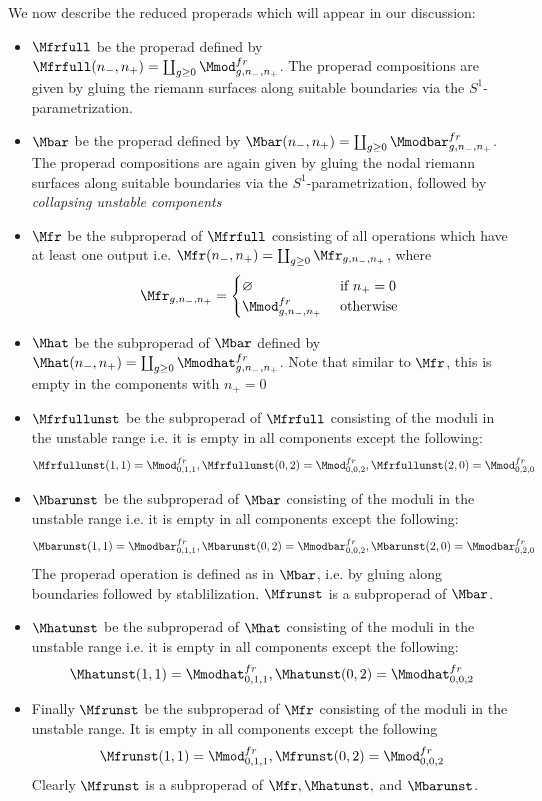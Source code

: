 \documentclass[a4paper,10pt]{amsart}
\begin{document}
We now describe the reduced properads which will appear in our discussion:
	\begin{itemize}
	\item $\Mfrfull$ be the properad defined by $\Mfrfull (n_-,n_+) = \coprod_{g \geq 0} \Mmod^{fr}_{g,n_-,n_+}$. The properad compositions are given by gluing the riemann surfaces along suitable boundaries via the $S^1$-parametrization.
	\item $\Mbar$ be the properad defined by $\Mbar (n_-,n_+) = \coprod_{g \geq 0} \Mmodbar^{fr}_{g,n_-,n_+}$. The properad compositions are again given by gluing the nodal riemann surfaces along suitable boundaries via the $S^1$-parametrization, followed by \emph{collapsing unstable components}
	\item $\Mfr$ be   the subproperad of $\Mfrfull$ consisting of all operations which have at least one output i.e. $\Mfr (n_-,n_+) = \coprod_{g \geq 0} \Mfr_{g,n_-,n_+}$, where
\[\Mfr_{g,n_-,n_+} = \begin{cases} \varnothing &\mbox{ if } n_+=0 \\ \Mmod^{fr}_{g,n_-,n_+} &\mbox{ otherwise }\end{cases} \]
	\item $\Mhat$ be the subproperad of $\Mbar$ defined by $\Mhat (n_-,n_+) = \coprod_{g \geq 0}\Mmodhat^{fr}_{g,n_-,n_+}$. Note that similar to $\Mfr$, this is empty in the components with $n_+=0$
	\item $\Mfrfullunst$ be the subproperad of  $\Mfrfull$ consisting of the moduli in the unstable range i.e. it is empty in all components except the following:
\[
				\Mfrfullunst(1,1) = \Mmod^{fr}_{0,1,1}, \Mfrfullunst(0,2) = \Mmod^{fr}_{0,0,2}, \Mfrfullunst(2,0) = \Mmod^{fr}_{0,2,0} %
\]
	\item $\Mbarunst$ be the subproperad of  $\Mbar$ consisting of the moduli in the unstable range i.e. it is empty in all components except the following:
\[
				\Mbarunst(1,1)=\Mmodbar^{fr}_{0,1,1}, \Mbarunst(0,2) = \Mmodbar^{fr}_{0,0,2}, \Mbarunst(2,0) = \Mmodbar^{fr}_{0,2,0} %
\]
	The properad operation is defined as in $\Mbar$, i.e. by gluing along boundaries followed by stablilization. $\Mfrunst$ is a subproperad of $\Mbar$.
	\item $\Mhatunst$ be the subproperad of $\Mhat$ consisting of the moduli in the unstable range i.e. it is empty in all components except the following:
\[
				\Mhatunst(1,1)=\Mmodhat^{fr}_{0,1,1} , 	  \Mhatunst(0,2)=\Mmodhat^{fr}_{0,0,2} 
\]
	\item Finally $\Mfrunst$ be the subproperad of $\Mfr$ consisting of the moduli in the unstable range. It is empty in all components except the following
\[
	  \Mfrunst(1,1)=\Mmod^{fr}_{0,1,1} , 	  \Mfrunst(0,2)=\Mmod^{fr}_{0,0,2} 
\]
Clearly $\Mfrunst$ is a subproperad of $\Mfr, \Mhatunst,$ and $\Mbarunst$.
	\end{itemize}
\end{document}
